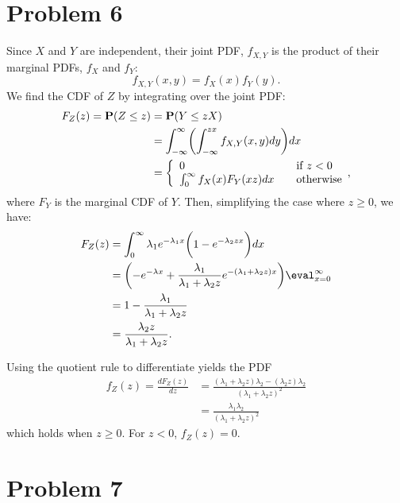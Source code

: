 \documentclass{homework}
\begin{document}
\section{Problem 6}
Since $X$ and $Y$ are independent, their joint PDF, $f_{X,Y}$ is the product of their
marginal PDFs, $f_X$ and $f_Y$:
\begin{equation*}
    f_{X,Y}(x, y) = f_X(x) f_Y(y).
\end{equation*}
We find the CDF of $Z$ by integrating over the joint PDF:
\begin{align*}
    F_Z(z) = {\bf P}(Z \leq z) &= {\bf P}(Y \leq z X) \\
        &= \int_{-\infty}^{\infty} \biggl(
            \int_{-\infty}^{zx} f_{X,Y}(x, y) dy
        \biggr) dx \\
        &= \biggl\{
            \begin{array}{ll}
                0 &\quad \text{if } z < 0 \\
                \int_{0}^{\infty} f_X(x) F_Y(xz) dx & \quad \text{otherwise}
            \end{array}
        \biggr.,
\end{align*}
where $F_Y$ is the marginal CDF of $Y$. Then, simplifying the case where $z \geq 0$, we have:
\begin{align*}
    F_Z(z) &= \int_{0}^{\infty} \lambda_1 e^{-\lambda_1 x} \biggl(
        1 - e^{-\lambda_2zx}
    \biggr) dx \\
    &= \biggl(
        -e^{-\lambda x} + \frac{\lambda_1}{\lambda_1 + \lambda_2 z} e^{-(\lambda_1 + \lambda_2 z)x}
    \biggr) \eval_{x=0}^\infty \\
    &= 1 - \frac{\lambda_1}{\lambda_1 + \lambda_2 z} \\
    &= \frac{\lambda_2 z}{\lambda_1 + \lambda_2 z}.
\end{align*} 

Using the quotient rule to differentiate yields the PDF
\begin{align*}
    f_Z(z) = \frac{dF_Z(z)}{dz} &= \frac{
        (\lambda_1 + \lambda_2z) \lambda_2 - (\lambda_2 z) \lambda_2
    }{(\lambda_1 + \lambda_2z)^2} \\
    &= \frac{\lambda_1 \lambda_2}{(\lambda_1 + \lambda_2 z)^2}
\end{align*}
which holds when $z\geq0$. For $z<0$, $f_Z(z) = 0$.

\section{Problem 7}
\end{document}
